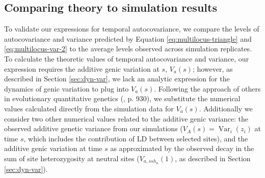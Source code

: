 \documentclass[11pt]{article}
\DeclareMathOperator{\var}{Var}
\begin{document}
\subsection{Comparing theory to simulation results}
\label{sec:ml-sim-res}

To validate our expressions for temporal autocovariance, we compare the levels
of autocovariance and variance predicted by Equation
\eqref{eq:multilocus-triangle} and \eqref{eq:multilocus-var-2} to the average
levels observed across simulation replicates. To calculate the theoretic values
of temporal autocovariance and variance, our expression requires the additive
genic variation at $s$, $V_a(s)$; however, as described in Section
\ref{sec:dyn-var}, we lack an analytic expression for the dynamics of genic
variation to plug into $V_a(s)$.  Following the approach of others in
evolutionary quantitative genetics (\cite{Turelli1994-rd}, p. 930), we
substitute the numerical values calculated directly from the simulation data
for $V_a(s)$. Additionally we consider two other numerical values related to
the additive genic variance: the observed additive genetic variance from our
simulations ($V_A(s) = \var_i(z_i)$ at time $s$, which includes the
contribution of LD between selected sites), and the additive genic variation at
time $s$ as approximated by the observed decay in the sum of site
heterozygosity at neutral sites ($V_{a,ssh_n}(1)$, as described in Section
\ref{sec:dyn-var}). 
\end{document}
